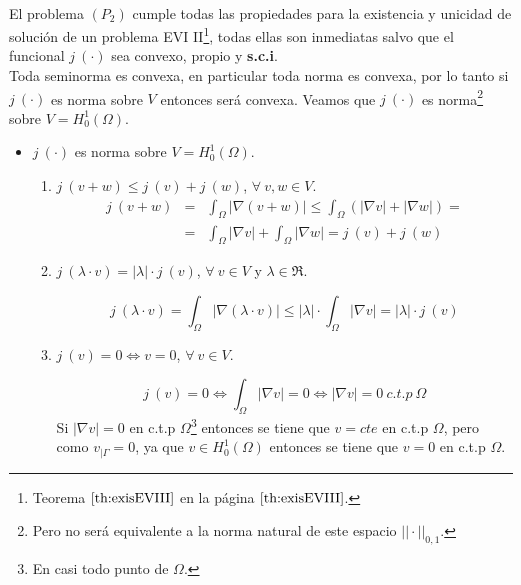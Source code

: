 \begin{demosteorema}
\ \\
El problema $(P_2)$ cumple todas las propiedades para la existencia y unicidad
de soluci\'on de un problema EVI II\footnote{Teorema $\ref{th:exisEVIII}$ en la
p\'agina $\pageref{th:exisEVIII}$.}, todas ellas son inmediatas salvo que el
funcional $j\ (\cdot )$ sea convexo, propio y \textbf{s.c.i}.\\

Toda seminorma es convexa, en particular toda norma es convexa, por lo tanto
si $j\ (\cdot )$ es norma sobre $V$ entonces ser\'a convexa. Veamos que
$j\ (\cdot )$ es norma\footnote{Pero no ser\'a equivalente a la norma natural
de este espacio $||\cdot ||_{0,1}$.} sobre $V=H^1_0(\Omega )$.

\begin{itemize}
\item $j\ (\cdot )$ es norma sobre $V=H^1_0(\Omega )$.
\begin{enumerate}
\item $j\ (v+w) \le j\ (v)+j\ (w)$, $\forall \ v,w \in V$.
\begin{eqnarray*}
j\ (v+w)&=&\int_{\Omega } |\nabla (v+w)| \le \int_{\Omega }(|\nabla v|+
|\nabla w|) = \\ 
&=& \int_{\Omega }|\nabla v|+\int_{\Omega }|\nabla w|=j\ (v) + j\ (w)
\end{eqnarray*}

\item $j\ (\lambda \cdot v) = |\lambda |\cdot j\ (v)$, $\forall \ v\in V$ y
$\lambda \in \Re$.

\begin{displaymath}
j\ (\lambda \cdot v) =\int_{\Omega } |\nabla (\lambda \cdot v)|\le |\lambda |
\cdot \int_{\Omega } |\nabla v| = |\lambda |\cdot j\ (v)
\end{displaymath}

\item $j\ (v)= 0\Longleftrightarrow v = 0$, $\forall \ v \in V$.

\begin{displaymath}
j\ (v) = 0 \Longleftrightarrow \int_{\Omega } |\nabla v| = 0
\Longleftrightarrow |\nabla v| = 0\ c.t.p\ \Omega
\end{displaymath}
Si $|\nabla v|= 0$ en c.t.p $\Omega$\footnote{En casi todo punto de $\Omega$.}
entonces se tiene que $v = cte$ en c.t.p $\Omega$, pero como $v_{|\Gamma}=0$,
ya que $v\in H^1_0(\Omega )$ entonces se tiene que $v=0$ en c.t.p $\Omega$.


\end{enumerate}
\end{itemize}
\end{demosteorema}
